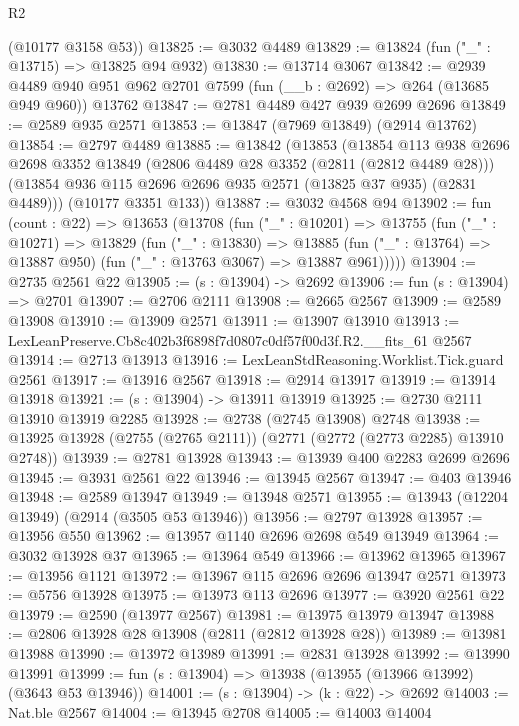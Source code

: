 \begin{lexlean}{R2}
\begin{coremodule}
      (@10177 @3158 @53))
@13825 := @3032 @4489
@13829 := @13824 (fun ("_" : @13715) => @13825 @94 @932)
@13830 := @13714 @3067
@13842 := @2939
    @4489
    @940
    @951
    @962
    @2701
    @7599
    (fun (__b : @2692) => @264 (@13685 @949 @960))
    @13762
@13847 := @2781 @4489 @427 @939 @2699 @2696
@13849 := @2589 @935 @2571
@13853 := @13847 (@7969 @13849) (@2914 @13762)
@13854 := @2797 @4489
@13885 := @13842
    (@13853
      (@13854
        @113
        @938
        @2696
        @2698
        @3352
        @13849
        (@2806 @4489 @28 @3352 (@2811 (@2812 @4489 @28)))
        (@13854 @936 @115 @2696 @2696 @935 @2571 (@13825 @37 @935) (@2831 @4489)))
      (@10177 @3351 @133))
@13887 := @3032 @4568 @94
@13902 := fun (count : @22) =>
  @13653
    (@13708
      (fun ("_" : @10201) =>
      @13755
        (fun ("_" : @10271) =>
        @13829
          (fun ("_" : @13830) =>
          @13885 (fun ("_" : @13764) => @13887 @950) (fun ("_" : @13763 @3067) => @13887 @961)))))
@13904 := @2735 @2561 @22
@13905 := (s : @13904) -> @2692
@13906 := fun (s : @13904) => @2701
@13907 := @2706 @2111
@13908 := @2665 @2567
@13909 := @2589 @13908
@13910 := @13909 @2571
@13911 := @13907 @13910
@13913 := LexLeanPreserve.Cb8c402b3f6898f7d0807c0df57f00d3f.R2.__fits_61 @2567
@13914 := @2713 @13913
@13916 := LexLeanStdReasoning.Worklist.Tick.guard @2561
@13917 := @13916 @2567
@13918 := @2914 @13917
@13919 := @13914 @13918
@13921 := (s : @13904) -> @13911 @13919
@13925 := @2730 @2111 @13910 @13919 @2285
@13928 := @2738 (@2745 @13908) @2748
@13938 := @13925 @13928 (@2755 (@2765 @2111)) (@2771 (@2772 (@2773 @2285) @13910 @2748))
@13939 := @2781 @13928
@13943 := @13939 @400 @2283 @2699 @2696
@13945 := @3931 @2561 @22
@13946 := @13945 @2567
@13947 := @403 @13946
@13948 := @2589 @13947
@13949 := @13948 @2571
@13955 := @13943 (@12204 @13949) (@2914 (@3505 @53 @13946))
@13956 := @2797 @13928
@13957 := @13956 @550
@13962 := @13957 @1140 @2696 @2698 @549 @13949
@13964 := @3032 @13928 @37
@13965 := @13964 @549
@13966 := @13962 @13965
@13967 := @13956 @1121
@13972 := @13967 @115 @2696 @2696 @13947 @2571
@13973 := @5756 @13928
@13975 := @13973 @113 @2696
@13977 := @3920 @2561 @22
@13979 := @2590 (@13977 @2567)
@13981 := @13975 @13979 @13947
@13988 := @2806 @13928 @28 @13908 (@2811 (@2812 @13928 @28))
@13989 := @13981 @13988
@13990 := @13972 @13989
@13991 := @2831 @13928
@13992 := @13990 @13991
@13999 := fun (s : @13904) => @13938 (@13955 (@13966 @13992) (@3643 @53 @13946))
@14001 := (s : @13904) -> (k : @22) -> @2692
@14003 := Nat.ble @2567
@14004 := @13945 @2708
@14005 := @14003 @14004

\end{coremodule}
\end{lexlean}
